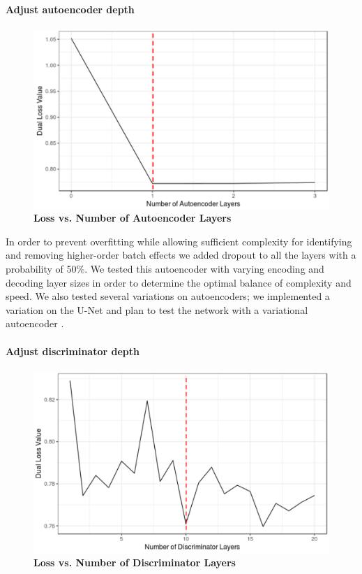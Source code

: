 \documentclass{article}
\begin{document}
\paragraph{Adjust autoencoder depth}

\begin{figure}
	\centering
	\includegraphics[width=\columnwidth]{figures/supplement/ae_layers.png}
	\caption{\textbf{Loss vs. Number of Autoencoder Layers}
	}
	\label{fig:ae}
\end{figure}

In order to prevent overfitting while allowing sufficient complexity for identifying and removing higher-order batch effects we added dropout to all the layers with a probability of 50\%.
We tested this autoencoder with varying encoding and decoding layer sizes in order to determine the optimal balance of complexity and speed.
We also tested several variations on autoencoders; we implemented a variation on the U-Net \cite{ronneberger_u-net_2015} and plan to test the network with a variational autoencoder \cite{kingma_auto-encoding_2013}.

\paragraph{Adjust discriminator depth}

\begin{figure}
	\centering
	\includegraphics[width=\columnwidth]{figures/supplement/disc_layers.png}
	\caption{\textbf{Loss vs. Number of Discriminator Layers}
	}
	\label{fig:disc}
\end{figure}
\end{document}
